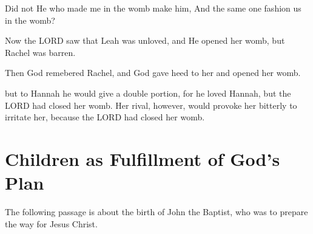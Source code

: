 \begin{scripture}[Job 31:15]
    Did not He who made me in the womb make him, And the same one fashion us in the womb?
\end{scripture}

\vspace{1\baselineskip}

\begin{scripture}[Genesis 29:31]
    Now the LORD saw that Leah was unloved, and He opened her womb, but Rachel was barren.
\end{scripture}

\vspace{1\baselineskip}

\begin{scripture}[Genesis 30:22]
    Then God remebered Rachel, and God gave heed to her and opened her womb.
\end{scripture}

\vspace{1\baselineskip}

\begin{scripture}[1 Samuel 1:5-6]
    but to Hannah he would give a double portion, for he loved Hannah, but the LORD had closed her womb.
    Her rival, however, would provoke her bitterly to irritate her, because the LORD had closed her womb.
\end{scripture}

\newpage
\section{Children as Fulfillment of God's Plan}

The following passage is about the birth of John the Baptist, who was to prepare the way for Jesus Christ.\\


